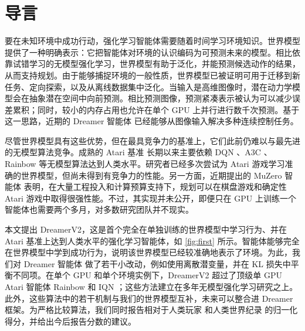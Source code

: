 \section{导言}
\label{sec:intro}



要在未知环境中成功行动，强化学习智能体需要随着时间学习环境知识。世界模型提供了一种明确表示：它把智能体对环境的认识编码为可预测未来的模型。相比依靠试错学习的无模型强化学习，世界模型有助于泛化，并能预测候选动作的结果，从而支持规划\citep{sutton1991dyna}。由于能够捕捉环境的一般性质，世界模型已被证明可用于迁移到新任务\citep{byravan2019ivg}、定向探索\citep{sekar2020plan2explore}，以及从离线数据集中泛化\citep{yu2020mopo}。当输入是高维图像时，潜在动力学模型会在抽象潜在空间中向前预测\citep{watter2015e2c,ha2018worldmodels,hafner2018planet,zhang2018solar}。相比预测图像，预测紧凑表示被认为可以减少误差累积；同时，较小的内存占用也允许在单个 GPU 上并行进行数千次预测\citep{hafner2018planet,hafner2019dreamer}。基于这一思路，近期的 Dreamer 智能体\citep{hafner2019dreamer} 已经能够从图像输入解决多种连续控制任务。

尽管世界模型具有这些优势，但在最具竞争力的基准上，它们此前仍难以与最先进的无模型算法竞争。成熟的 Atari 基准\citep{bellemare2013ale} 长期以来主要依赖 DQN \citep{mnih2015dqn}、A3C \citep{mnih2016a3c}、Rainbow \citep{hessel2018rainbow} 等无模型算法达到人类水平。研究者已经多次尝试为 Atari 游戏学习准确的世界模型，但尚未得到有竞争力的性能\citep{oh2015atari,chiappa2017recenvsim,kaiser2019simple}。另一方面，近期提出的 MuZero 智能体\citep{schrittwieser2019muzero} 表明，在大量工程投入和计算预算支持下，规划可以在棋盘游戏和确定性 Atari 游戏中取得很强性能。不过，其实现并未公开，即便只在 GPU 上训练一个智能体也需要两个多月，对多数研究团队并不现实。

本文提出 DreamerV2，这是首个完全在单独训练的世界模型中学习行为、并在 Atari 基准上达到人类水平的强化学习智能体，如 \cref{fig:first} 所示。智能体能够完全在世界模型中学到成功行为，说明该世界模型已经较准确地表示了环境。为此，我们对 Dreamer 智能体\citep{hafner2019dreamer} 做了若干小改动，例如使用离散潜变量，并在 KL 损失中平衡不同项。在单个 GPU 和单个环境实例下，DreamerV2 超过了顶级单 GPU Atari 智能体 Rainbow \citep{hessel2018rainbow} 和 IQN \citep{dabney2018iqn}；这些方法建立在多年无模型强化学习研究之上\citep{van2015ddqn,schaul2015prioritizedreplay,wang2016duelingdqn,bellemare2017c51,fortunato2017noisynets}。此外，这些算法中的若干机制与我们的世界模型互补，未来可以整合进 Dreamer 框架。为严格比较算法，我们同时报告相对于人类玩家\citep{mnih2015dqn} 和人类世界纪录\citep{toromanoff2019atarirecords} 的归一化得分，并给出今后报告分数的建议。
